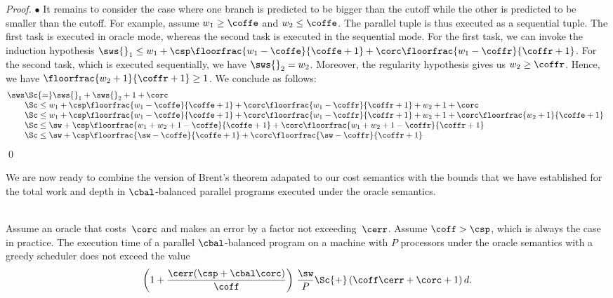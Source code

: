 \begin{proof}
$\bullet$  It remains to consider the case where one branch
is predicted to be bigger than the cutoff while the other
is predicted to be smaller than the cutoff. For example,
assume $w_1 \geq \coffe$ and $w_2 \leq \coffe$.
The parallel tuple is thus executed as a sequential tuple.
The first task is executed in oracle mode, whereas the
second task is executed in the sequential mode.
For the first task, we can invoke the induction hypothesis
$\sws{}_1 \leq w_1 + \csp \floorfrac{w_1-\coffe}{\coffe+1} + \corc \floorfrac{w_1-\coffr}{\coffr+1} $.
For the second task, which is executed sequentially, we have $\sws{}_2 = w_2$.
Moreover, the regularity hypothesis gives us $w_2 \geq \coffr$.
Hence, we have $\floorfrac{w_2+1}{\coffr+1} \geq 1$.
We conclude as follows:
%
$$\begin{array}{@{}l@{}ll}
\sws 
& \Sc{=} \sws{}_1 + \sws{}_2 + 1 + \corc \\ 
& \Sc\leq w_1 + \csp \floorfrac{w_1-\coffe}{\coffe+1} 
+ \corc \floorfrac{w_1-\coffr}{\coffr+1} + w_2 + 1 + \corc \\
& \Sc\leq w_1 + \csp \floorfrac{w_1-\coffe}{\coffe+1} 
+ \corc \floorfrac{w_1-\coffr}{\coffr+1} + w_2 + 1 + \corc \floorfrac{w_2+1}{\coffe+1} \\
& \Sc\leq \sw + \csp \floorfrac{w_1+w_2+1-\coffe}{\coffe+1} + \corc \floorfrac{w_1+w_2+1-\coffr}{\coffr+1} \\
& \Sc\leq \sw + \csp \floorfrac{\sw-\coffe}{\coffe+1} + \corc \floorfrac{\sw-\coffr}{\coffr+1} \\
\end{array}$$
\qed
\end{proof}

We are now ready to combine the version of Brent's theorem
adapated to our cost semantics with the bounds that we
have established for the total work and depth 
in $\cbal$-balanced parallel programs executed
under the oracle semantics.

\begin{theorem}
\label{thm:orc-cost-bound}
\label{thm:orc-time-bound}~\\
Assume an oracle that costs~$\corc$ and makes an error by a factor not
exceeding~$\cerr$. Assume $\coff > \csp$, which is always the case
in practice.
The execution time of a parallel $\cbal$-balanced
program on a machine with $P$ processors under the oracle semantics
with a greedy scheduler does not exceed the value
\[
\left( 1+\frac{\cerr(\csp+\cbal\corc)}{\coff} \right)\,\frac{\sw}{P} \Sc{+} \left( \coff\cerr + \corc + 1\right)d.
\]
\end{theorem}

